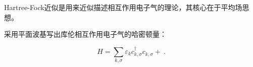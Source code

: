 
Hartree-Fock近似是用来近似描述相互作用电子气的理论，其核心在于平均场思想。

采用平面波基写出库伦相互作用电子气的哈密顿量：

$$H=\sum\limits_{k,\sigma}\varepsilon_k c_{k,\sigma}^\dagger c_{k,\sigma}^~+~. $$
